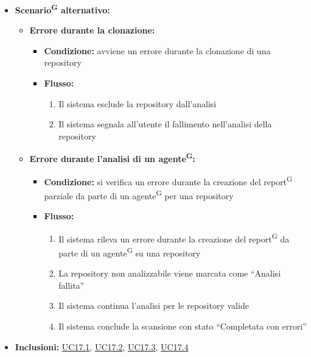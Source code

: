 \documentclass[a4paper, 11pt]{article}
\begin{document}
\begin{itemize}
\begin{enumerate}
		\item Gli agenti eseguono le analisi parziali sulle repository assegnate (\hyperref[UC17.3]{UC17.3 - Esegui analisi parziale})
		\item L'orchestratore raccoglie i report\textsuperscript{G} parziali e genera il report\textsuperscript{G} completo (\hyperref[UC17.4]{UC17.4 - Aggrega report e salva risultati})
	\end{enumerate}
	\item \textbf{Scenario\textsuperscript{G} alternativo:}
	\begin{itemize}
		\item \textbf{Errore durante la clonazione:} 
			\begin{itemize}
				\item \textbf{Condizione:} avviene un errore durante la clonazione di una repository
				\item \textbf{Flusso:} 
				\begin{enumerate}
					\item Il sistema esclude la repository dall'analisi
					\item Il sistema segnala all'utente il fallimento nell'analisi della repository
				\end{enumerate}
			\end{itemize}
		\item \textbf{Errore durante l'analisi di un agente\textsuperscript{G}:} 
			\begin{itemize}
				\item \textbf{Condizione:} si verifica un errore durante la creazione del report\textsuperscript{G} parziale da parte di un agente\textsuperscript{G} per una repository
				\item \textbf{Flusso:} 
				\begin{enumerate}
					\item Il sistema rileva un errore durante la creazione del report\textsuperscript{G} da parte di un agente\textsuperscript{G} su una repository
					\item La repository non analizzabile viene marcata come “Analisi fallita”
					\item Il sistema continua l'analisi per le repository valide
					\item Il sistema conclude la scansione con stato “Completata con errori”
				\end{enumerate}
			\end{itemize}
	\end{itemize}
	\item \textbf{Inclusioni:} \hyperref[UC17.1]{UC17.1}, \hyperref[UC17.2]{UC17.2}, \hyperref[UC17.3]{UC17.3}, \hyperref[UC17.4]{UC17.4}
\end{itemize}
\end{document}

